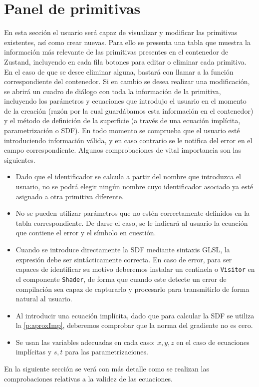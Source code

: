 \section{Panel de primitivas}
En esta sección el usuario será capaz de visualizar y modificar las primitivas existentes, así como crear nuevas. Para ello se presenta una tabla que muestra la información más relevante de las primitivas presentes en el contenedor de Zustand, incluyendo en cada fila botones para editar o eliminar cada primitiva. En el caso de que se desee eliminar alguna, bastará con llamar a la función correspondiente del contenedor. Si en cambio se desea realizar una modificación, se abrirá un cuadro de diálogo con toda la información de la primitiva, incluyendo los parámetros y ecuaciones que introdujo el usuario en el momento de la creación (razón por la cual guardábamos esta información en el contenedor) y el método de definición de la superficie (a través de una ecuación implícita, parametrización o SDF). En todo momento se comprueba que el usuario esté introduciendo información válida, y en caso contrario se le notifica del error en el campo correspondiente. Algunos comprobaciones de vital importancia son las siguientes.
\begin{itemize}
    \item Dado que el identificador se calcula a partir del nombre que introduzca el usuario, no se podrá elegir ningún nombre cuyo identificador asociado ya esté asignado a otra primitiva diferente.
    \item No se pueden utilizar parámetros que no estén correctamente definidos en la tabla correspondiente. De darse el caso, se le indicará al usuario la ecuación que contiene el error y el símbolo en cuestión.
    \item Cuando se introduce directamente la SDF mediante sintaxis GLSL, la expresión debe ser sintácticamente correcta. En caso de error, para ser capaces de identificar su motivo deberemos instalar un centinela o \texttt{Visitor} en el componente \texttt{Shader}, de forma que cuando este detecte un error de compilación sea capaz de capturarlo y procesarlo para transmitirlo de forma natural al usuario.
    \item Al introducir una ecuación implícita, dado que para calcular la SDF se utiliza la \autoref{p:aproxImp}, deberemos comprobar que la norma del gradiente no es cero.
    \item Se usan las variables adecuadas en cada caso: $x,y,z$ en el caso de ecuaciones implícitas y $s,t$ para las parametrizaciones. 
\end{itemize}
En la siguiente sección se verá con más detalle como se realizan las comprobaciones relativas a la validez de las ecuaciones.\newline

